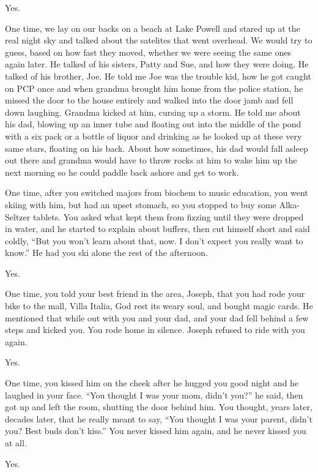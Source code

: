 \begin{paracol}{2}
\begin{leftcolumn}
\begin{ally}
Yes.
\end{ally}
One time, we lay on our backs on a beach at Lake Powell and stared up at the real night sky and talked about the satelites that went overhead. We would try to guess, based on how fast they moved, whether we were seeing the same ones again later. He talked of his sisters, Patty and Sue, and how they were doing. He talked of his brother, Joe. He told me Joe was the trouble kid, how he got caught on PCP once and when grandma brought him home from the police station, he missed the door to the house entirely and walked into the door jamb and fell down laughing. Grandma kicked at him, cursing up a storm. He told me about his dad, blowing up an inner tube and floating out into the middle of the pond with a six pack or a bottle of liquor and drinking as he looked up at these very same stars, floating on his back. About how sometimes, his dad would fall asleep out there and grandma would have to throw rocks at him to wake him up the next morning so he could paddle back ashore and get to work.

\begin{ally}
One time, after you switched majors from biochem to music education, you went skiing with him, but had an upset stomach, so you stopped to buy some Alka-Seltzer tablets. You asked what kept them from fizzing until they were dropped in water, and he started to explain about buffers, then cut himself short and said coldly, ``But you won't learn about that, now. I don't expect you really want to know.'' He had you ski alone the rest of the afternoon.
\end{ally}
Yes.

\begin{ally}
One time, you told your best friend in the area, Joseph, that you had rode your bike to the mall, Villa Italia, God rest its weary soul, and bought magic cards. He mentioned that while out with you and your dad, and your dad fell behind a few steps and kicked you. You rode home in silence. Joseph refused to ride with you again.
\end{ally}
Yes.

\begin{ally}
One time, you kissed him on the cheek after he hugged you good night and he laughed in your face. ``You thought I was your mom, didn't you?'' he said, then got up and left the room, shutting the door behind him. You thought, years later, decades later, that he really meant to say, ``You thought I was your parent, didn't you? Best buds don't kiss.'' You never kissed him again, and he never kissed you at all.
\end{ally}
Yes.


\end{leftcolumn}
\end{paracol}
